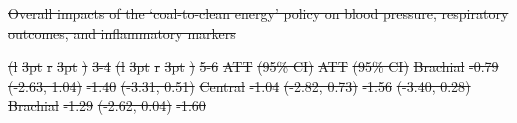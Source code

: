 \documentclass[
  letterpaper,
  DIV=11,
  numbers=noendperiod]{scrartcl}
\makeatletter
\renewenvironment{table}%
   {\renewcommand\familydefault\sfdefault
    \@float{table}}
   {\end@float}
\providecommand{\DIFdel}[1]{{\protect\color{red}\sout{#1}}}                      %
\providecommand{\DIFdelbegin}{} %
\providecommand{\DIFdelend}{} %
\providecommand{\DIFdelFL}[1]{\DIFdel{#1}} %
\providecommand{\DIFdelbeginFL}{} %
\providecommand{\DIFdelendFL}{} %
\newcommand{\DIFscaledelfig}{0.5}
\newlength{\DIFdelgraphicswidth} %
\newlength{\DIFdelgraphicsheight} %
\newcommand{\DIFdelincludegraphics}[2][]{%
\sbox{\DIFdelgraphicsbox}{\DIFOincludegraphics[#1]{#2}}%
\settoboxwidth{\DIFdelgraphicswidth}{\DIFdelgraphicsbox} %
\settoboxtotalheight{\DIFdelgraphicsheight}{\DIFdelgraphicsbox} %
\scalebox{\DIFscaledelfig}{%
\parbox[b]{\DIFdelgraphicswidth}{\usebox{\DIFdelgraphicsbox}\\[-\baselineskip] \rule{\DIFdelgraphicswidth}{0em}}\llap{\resizebox{\DIFdelgraphicswidth}{\DIFdelgraphicsheight}{%
\setlength{\unitlength}{\DIFdelgraphicswidth}%
\begin{picture}(1,1)%
\thicklines\linethickness{2pt} %
{\color[rgb]{1,0,0}\put(0,0){\framebox(1,1){}}}%
{\color[rgb]{1,0,0}\put(0,0){\line( 1,1){1}}}%
{\color[rgb]{1,0,0}\put(0,1){\line(1,-1){1}}}%
\end{picture}%
}\hspace*{3pt}}} %
} %
\DeclareRobustCommand{\DIFdelbegin}{\DIFOdelbegin \let\includegraphics\DIFdelincludegraphics} %
\DeclareRobustCommand{\DIFdelend}{\DIFOaddend \let\includegraphics\DIFOincludegraphics} %
\DeclareRobustCommand{\DIFdelbeginFL}{\DIFOdelbeginFL \let\includegraphics\DIFdelincludegraphics} %
\DeclareRobustCommand{\DIFdelendFL}{\DIFOaddendFL \let\includegraphics\DIFOincludegraphics} %
\makeatother
\begin{document}
\DIFdelbegin %
\DIFdelend \begin{table}
\DIFdelbeginFL %
{%
\DIFdelFL{Overall impacts of the `coal-to-clean energy' policy on blood pressure,
respiratory outcomes, and inflammatory markers }}%
\DIFdelendFL 

\DIFdelbeginFL %
\DIFdelFL{(l}%
\DIFdelFL{3pt}%
\DIFdelFL{r}%
\DIFdelFL{3pt}%
\DIFdelFL{)}%
\DIFdelFL{3-4}%
\DIFdelFL{(l}%
\DIFdelFL{3pt}%
\DIFdelFL{r}%
\DIFdelFL{3pt}%
\DIFdelFL{)}%
\DIFdelFL{5-6}%
\DIFdelFL{ATT }%
\DIFdelFL{(95\% CI) }%
\DIFdelFL{ATT }%
\DIFdelFL{(95\% CI)}%
\DIFdelFL{\hspace{1em} }%
\DIFdelFL{Brachial }%
\DIFdelFL{-0.79 }%
\DIFdelFL{(-2.63, 1.04) }%
\DIFdelFL{-1.40 }%
\DIFdelFL{(-3.31, 0.51)}%
\DIFdelFL{Central }%
\DIFdelFL{-1.04 }%
\DIFdelFL{(-2.82, 0.73) }%
\DIFdelFL{-1.56 }%
\DIFdelFL{(-3.40, 0.28)}%
\DIFdelFL{\hspace{1em} }%
\DIFdelFL{Brachial }%
\DIFdelFL{-1.29 }%
\DIFdelFL{(-2.62, 0.04) }%
\DIFdelFL{-1.60 }%

\end{table}
\end{document}
